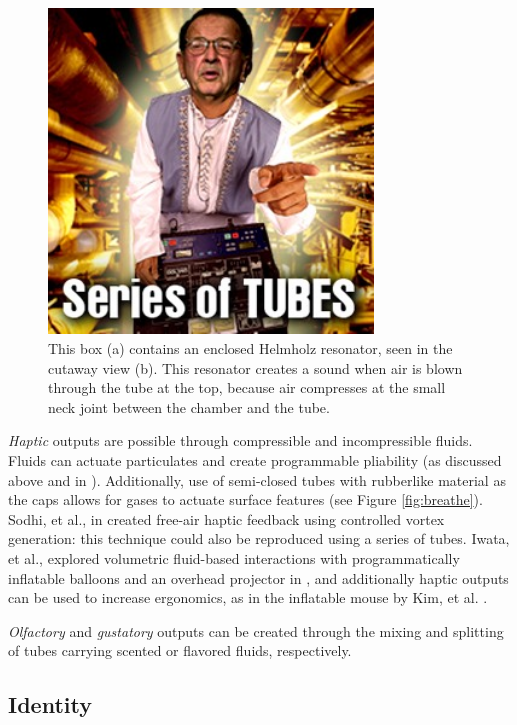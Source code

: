 \begin{figure}[h]
\centering
    \includegraphics[width=3.4in]{figures/series-of-tubes.jpg}
\caption{This box (a) contains an enclosed Helmholz resonator, seen in the cutaway view (b).  This resonator creates a sound when air is blown through the tube at the top, because air compresses at the small neck joint between the chamber and the tube.  }
\label{fig:ocarina}
\end{figure}

\emph{Haptic} outputs are possible through compressible and incompressible fluids.  Fluids can actuate particulates and create programmable pliability (as discussed above and in \cite{Follmer-jamming}).  Additionally, use of semi-closed tubes with rubberlike material as the caps allows for gases to actuate surface features (see Figure \ref{fig:breathe}).  Sodhi, et al., in \cite{Sodhi-aireal} created free-air haptic feedback using controlled vortex generation: this technique could also be reproduced using a series of tubes.  Iwata, et al., explored volumetric fluid-based interactions with programmatically inflatable balloons and an overhead projector in \cite{Iwata-volflex}, and additionally haptic outputs can be used to increase ergonomics, as in the inflatable mouse by Kim, et al. \cite{Kim-inflatablemouse}.

\emph{Olfactory} and \emph{gustatory} outputs can be created through the mixing and splitting of tubes carrying scented or flavored fluids, respectively.

\subsection{Identity}

